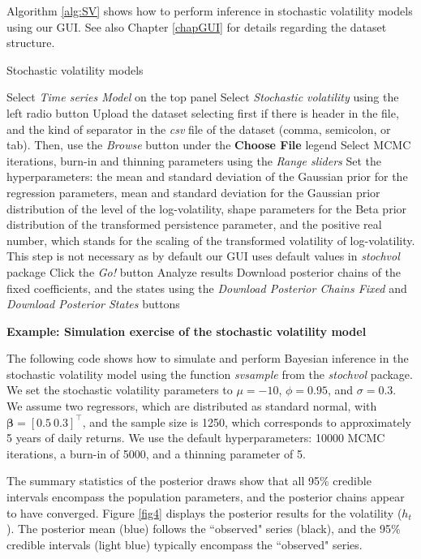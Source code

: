 Algorithm \ref{alg:SV} shows how to perform inference in stochastic volatility models using our GUI. See also Chapter \ref{chapGUI} for details regarding the dataset structure. 

\begin{algorithm}[h!]
	\caption{Stochastic volatility models}\label{alg:SV}
	\begin{algorithmic}[1]  		 			
		\State Select \textit{Time series Model} on the top panel
		\State Select \textit{Stochastic volatility} using the left radio button
		\State Upload the dataset selecting first if there is header in the file, and the kind of separator in the \textit{csv} file of the dataset (comma, semicolon, or tab). Then, use the \textit{Browse} button under the \textbf{Choose File} legend
		\State Select MCMC iterations, burn-in and thinning parameters using the \textit{Range sliders}
		\State Set the hyperparameters: the mean and standard deviation of the Gaussian prior for the regression parameters, mean and standard deviation for the Gaussian prior distribution of the level of the log-volatility, shape parameters for the Beta prior distribution of the transformed persistence parameter, and the positive real number, which stands for the scaling of the transformed volatility of log-volatility. This step is not necessary as by default our GUI uses default values in \textit{stochvol} package
		\State Click the \textit{Go!} button
		\State Analyze results
		\State Download posterior chains of the fixed coefficients, and the states using the \textit{Download Posterior Chains Fixed} and \textit{Download Posterior States} buttons
	\end{algorithmic} 
\end{algorithm}

\textbf{Example: Simulation exercise of the stochastic volatility model}

The following code shows how to simulate and perform Bayesian inference in the stochastic volatility model using the function \textit{svsample} from the \textit{stochvol} package. We set the stochastic volatility parameters to $\mu = -10$, $\phi = 0.95$, and $\sigma = 0.3$. We assume two regressors, which are distributed as standard normal, with $\bm{\beta} = [0.5 \ 0.3]^{\top}$, and the sample size is 1250, which corresponds to approximately 5 years of daily returns. We use the default hyperparameters: 10000 MCMC iterations, a burn-in of 5000, and a thinning parameter of 5.

The summary statistics of the posterior draws show that all 95\% credible intervals encompass the population parameters, and the posterior chains appear to have converged. Figure \ref{fig4} displays the posterior results for the volatility ($h_t$). The posterior mean (blue) follows the ``observed" series (black), and the 95\% credible intervals (light blue) typically encompass the ``observed" series.

